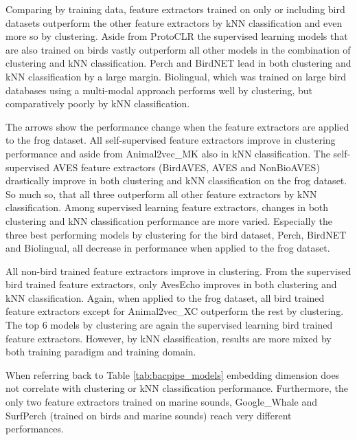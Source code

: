 Comparing by training data, feature extractors trained on only or including bird datasets outperform the other feature extractors by kNN classification and even more so by clustering.
Aside from ProtoCLR the supervised learning models that are also trained on birds vastly outperform all other models in the combination of clustering and kNN classification.
Perch and BirdNET lead in both clustering and kNN classification by a large margin.
Biolingual, which was trained on large bird databases using a multi-modal approach performs well by clustering, but comparatively poorly by kNN classification.

The arrows show the performance change when the feature extractors are applied to the frog dataset.
All self-supervised feature extractors improve in clustering performance and aside from Animal2vec\_MK also in kNN classification.
The self-supervised AVES feature extractors (BirdAVES, AVES and NonBioAVES) drastically improve in both clustering and kNN classification on the frog dataset.
So much so, that all three outperform all other feature extractors by kNN classification.
Among supervised learning feature extractors, changes in both clustering and kNN classification performance are more varied.
Especially the three best performing models by clustering for the bird dataset, Perch, BirdNET and Biolingual, all decrease in performance when applied to the frog dataset.

All non-bird trained feature extractors improve in clustering.
From the supervised bird trained feature extractors, only AvesEcho improves in both clustering and kNN classification.
Again, when applied to the frog dataset, all bird trained feature extractors except for Animal2vec\_XC outperform the rest by clustering.
The top 6 models by clustering are again the supervised learning bird trained feature extractors.
However, by kNN classification, results are more mixed by both training paradigm and training domain.

When referring back to Table \ref{tab:bacpipe_models} embedding dimension does not correlate with clustering or kNN classification performance.
Furthermore, the only two feature extractors trained on marine sounds, Google\_Whale and SurfPerch (trained on birds and marine sounds) reach very different performances.
    



